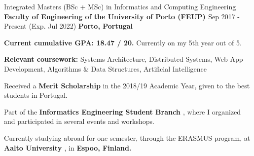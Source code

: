 

\begin{cventries}

  \cventry
    {Integrated Masters (BSc + MSc) in Informatics and Computing Engineering} %
    {\textbf{Faculty of Engineering of the University of Porto (FEUP) \href{https://sigarra.up.pt/feup/en/web_page.inicial}{\faExternalLink}}} %
    {Sep 2017 - Present (Exp. Jul 2022)} %
    {\textbf{Porto, Portugal}} %
    {
      \begin{cvitems} %
        \item {\textbf{Current cumulative GPA: 18.47 / 20.} Currently on my 5th year out of 5.}
        \item {\textbf{Relevant coursework:} Systems Architecture, Distributed Systems, Web App Development, Algorithms \& Data Structures, Artificial Intelligence}
        \item {Received a \textbf{Merit Scholarship} in the 2018/19 Academic Year, given to the best students in Portugal.}
        \item {Part of the \textbf{Informatics Engineering Student Branch \href{https://ni.fe.up.pt/}{\faExternalLink}}, where I organized and participated in several events and workshops.}
        \item{Currently studying abroad for one semester, through the ERASMUS program, at \textbf{Aalto University \href{https://www.aalto.fi/en}{\faExternalLink}}, in \textbf{Espoo, Finland.}}
      \end{cvitems}
    }
    

\end{cventries}
